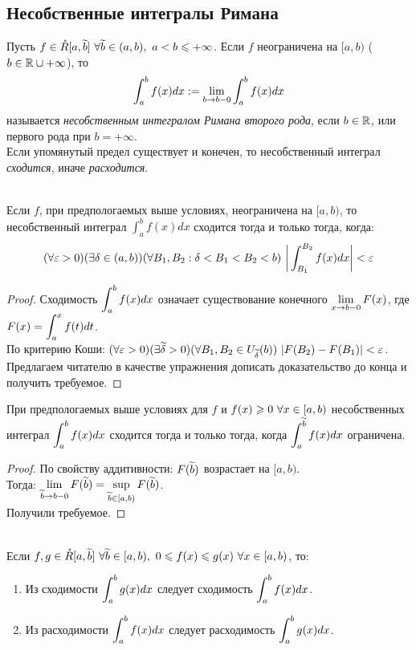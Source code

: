 \subsection{Несобственные интегралы Римана}
\begin{definition}
	Пусть $f\in\mc R[a,\t b]\ \fa\t b\in(a,b),\ a<b\le+\infty$. Если $f$ неограничена на $[a,b)$ ($b\in\mathbb{R}\cup+\infty$), то 
	\[\displaystyle\int_a^bf(x)dx:=\lim_{b\ra b-0}\int_a^bf(x)dx\] 
	называется \textit{несобственным интегралом Римана второго рода}, если $b\in\mathbb{R}$, или первого рода при $b=+\infty$. \\
	Если упомянутый предел существует и конечен, то несобственный интеграл \textit{сходится}, иначе \textit{расходится}.
\end{definition}
\begin{theorem}\label{11_th1}\\
	Если $f$, при предпологаемых выше условиях, неограничена на $[a,b)$, то несобственный интеграл $\displaystyle\int_a^bf(x)dx$ сходится тогда и только тогда, когда:
	\[(\fa\eps>0)(\ex\delta\in(a,b))(\fa B_1,B_2:\delta<B_1<B_2<b)\ \bigg|\int_{B_1}^{B_2}f(x)dx\bigg|<\eps\]
\end{theorem}
\begin{proof}
	Сходимость $\displaystyle\int_a^bf(x)dx$ означает существование конечного $\ds\lim_{x\ra b-0}F(x)$, где $\displaystyle F(x)=\int_a^xf(t)dt$.\\
	По критерию Коши: $\displaystyle(\forall\varepsilon>0)(\exists\widetilde\delta>0)(\forall B_1,B_2\in U_{\widetilde\delta}(b))\ |F(B_2)-F(B_1)|<\varepsilon$.
	Предлагаем читателю в качестве упражнения дописать доказательство до конца и получить требуемое.
\end{proof}
\begin{lemma}\label{11_le1}
	При предпологаемых выше условиях для $f$ и $f(x)\geqslant0\ \forall x\in[a,b)$ несобственных интеграл $\displaystyle\int_a^bf(x)dx$ сходится тогда и только тогда, когда $\displaystyle\int_a^{\widetilde b}f(x)dx$ ограничена.
\end{lemma}
\begin{proof}
	По свойству аддитивности: $F(\widetilde b)$ возрастает на $[a,b)$.\\
	Тогда: $\ds\lim_{\t b\ra b-0}F(\t b)=\sup_{\t b\in[a,b)}F(\t b)$.\\
	Получили требуемое.
\end{proof}
\begin{theorem}\label{11_th2}\\
	Если $f,g\in\mc R[a,\t b]\ \fa\t b\in[a,b),\ 0\le f(x)\le g(x)\ \fa x\in[a,b)$, то:
	\begin{enumerate}
		\item Из сходимости $\displaystyle\int_a^bg(x)dx$ следует сходимость $\displaystyle\int_a^bf(x)dx$.\\
		\item Из расходимости $\displaystyle\int_a^bf(x)dx$ следует расходимость $\displaystyle\int_a^bg(x)dx$.
	\end{enumerate}
\end{theorem}
